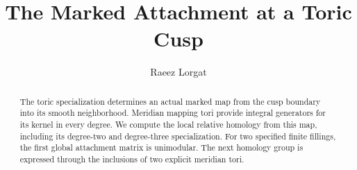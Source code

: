 \documentclass[11pt]{article}
\title{The Marked Attachment at a Toric Cusp}
\author{Raeez Lorgat}
\date{}
\numberwithin{equation}{section}
\begin{document}
\maketitle
\begin{abstract}
The toric specialization determines an actual marked map from the cusp
boundary into its smooth neighborhood. Meridian mapping tori provide
integral generators for its kernel in every degree. We compute the local
relative homology from this map, including its degree-two and degree-three
specialization. For two specified finite fillings, the first global
attachment matrix is unimodular. The next homology group is expressed
through the inclusions of two explicit meridian tori.
\end{abstract}


\end{document}
